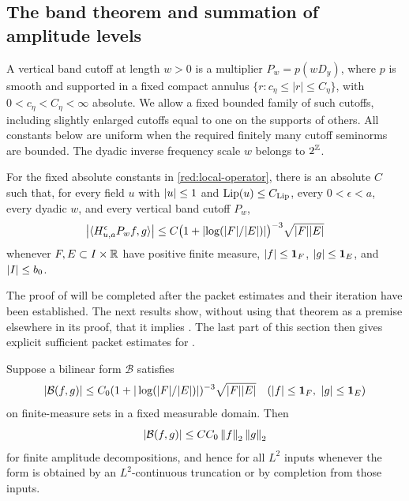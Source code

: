 \subsection{The band theorem and summation of amplitude levels}

A vertical band cutoff at length \(w>0\) is a multiplier
\(P_w=p(wD_y)\), where \(p\) is smooth and supported in a fixed
compact annulus
\(\{r:c_\eta\le|r|\le C_\eta\}\), with
\(0<c_\eta<C_\eta<\infty\) absolute. We allow a fixed bounded
family of such cutoffs, including slightly enlarged cutoffs equal to
one on the supports of others. All constants below are uniform when
the required finitely many cutoff seminorms are bounded. The dyadic
inverse frequency scale \(w\) belongs to \(2^{\mathbb Z}\).

\begin{theorem}
\label{thm:band-restricted}
For the fixed absolute constants in \eqref{red:local-operator}, there
is an absolute \(C\) such that, for every field \(u\) with
\(\left|u\right|\le1\) and \(\operatorname{Lip}(u)\le C_{\rm Lip}\), every
\(0<\epsilon<a\), every dyadic \(w\), and every vertical band
cutoff \(P_w\),
\begin{equation}\label{eq:src-1}
 \left|\langle H_{u,a}^{\epsilon}P_w f,g\rangle\right|
 \le C\bigl(1+\left|\log(|F|/|E|)\right|\bigr)^{-3}
       \sqrt{|F||E|}
\end{equation}
whenever \(F,E\subset I\times\mathbb R\) have positive finite measure,
\(\left|f\right|\le\mathbf 1_F\), \(\left|g\right|\le\mathbf 1_E\), and
\(\left|I\right|\le b_0\).
\end{theorem}

The proof of  will be completed after the
packet estimates and their iteration have been established. The next
results show, without using that theorem as a premise elsewhere in
its proof, that it implies . The last part of this
section then gives explicit sufficient packet estimates for
.

\begin{lemma}\label{red:restricted-strong}
Suppose a bilinear form \(\mathcal B\) satisfies
\[
 \left|\mathcal B(f,g)\right|
 \le C_0(1+|\log(|F|/|E|)|)^{-3}\sqrt{|F||E|}
 \quad (|f|\le\mathbf 1_F,\ |g|\le\mathbf 1_E)
\]
on finite-measure sets in a fixed measurable domain. Then
\[
 \left|\mathcal B(f,g)\right|\le C C_0\left\|f\right\|_2\left\|g\right\|_2
\]
for finite amplitude decompositions, and hence for all \(L^2\)
inputs whenever the form is obtained by an \(L^2\)-continuous
truncation or by completion from those inputs.
\end{lemma}


